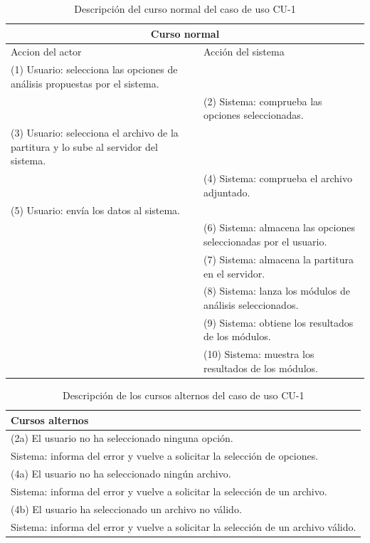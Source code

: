 \begin{table}[H]
	\begin{tabular}{@{}|p{7.1cm}|p{7.1cm}|@{}}
		\hline
		\multicolumn{2}{|c|}{\textbf{Curso normal}}\\ \hline
		{Accion del actor} & {Acción del sistema} \\ \hline
		(1) Usuario: selecciona las opciones de análisis propuestas por el sistema. & \\ \hline
		 & (2) Sistema: comprueba las opciones seleccionadas. \\ \hline 
		(3) Usuario: selecciona el archivo de la partitura y lo sube al servidor del sistema. &  \\ \hline
		 & (4) Sistema: comprueba el archivo adjuntado.  \\ \hline 
		(5) Usuario: envía los datos al sistema. & \\ \hline
		 & (6) Sistema: almacena las opciones seleccionadas por el usuario.  \\ \hline
		 & (7) Sistema: almacena la partitura en el servidor.  \\ \hline
		 & (8) Sistema: lanza los módulos de análisis seleccionados.  \\ \hline
		 & (9) Sistema: obtiene los resultados de los módulos. \\ \hline
		 & (10) Sistema: muestra los resultados de los módulos. \\ \hline
	\end{tabular}
	\caption{Descripción del curso normal del caso de uso CU-1}
	\label{CNCU-1}
\end{table}

\begin{table}[H]
	\begin{tabular}{@{}|p{14.7cm}|@{}}
		\hline
		\textbf{Cursos alternos}\\ \hline
		(2a) El usuario no ha seleccionado ninguna opción. \\ 
		\hspace{1.5cm}Sistema: informa del error y vuelve a solicitar la selección de opciones. \\
		(4a) El usuario no ha seleccionado ningún archivo. \\
		\hspace{1.5cm}Sistema: informa del error y vuelve a solicitar la selección de un archivo. \\
		(4b) El usuario ha seleccionado un archivo no válido. \\
		\hspace{1.5cm}Sistema: informa del error y vuelve a solicitar la selección de un archivo válido. \\ \hline
	\end{tabular}
	\caption{Descripción de los cursos alternos del caso de uso CU-1}
	\label{CACU-1}
\end{table}

